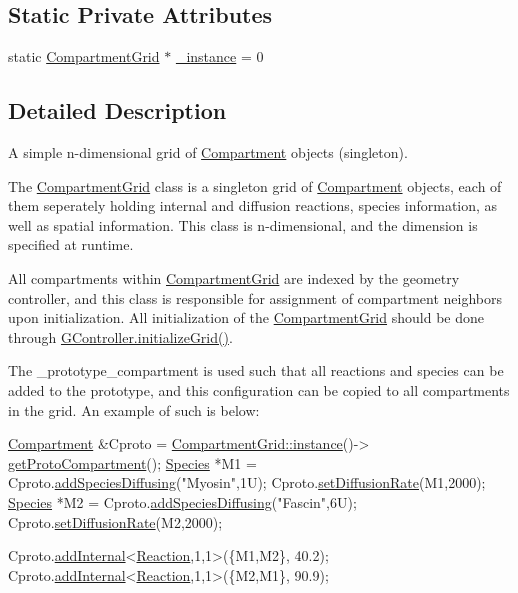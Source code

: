 \subsection*{Static Private Attributes}
\begin{DoxyCompactItemize}
\item 
static \hyperlink{classCompartmentGrid}{Compartment\+Grid} $\ast$ \hyperlink{classCompartmentGrid_ac0eb2be3df5e78d5fe6dbfb75b717866}{\+\_\+instance} = 0
\end{DoxyCompactItemize}


\subsection{Detailed Description}
A simple n-\/dimensional grid of \hyperlink{classCompartment}{Compartment} objects (singleton). 

The \hyperlink{classCompartmentGrid}{Compartment\+Grid} class is a singleton grid of \hyperlink{classCompartment}{Compartment} objects, each of them seperately holding internal and diffusion reactions, species information, as well as spatial information. This class is n-\/dimensional, and the dimension is specified at runtime.

All compartments within \hyperlink{classCompartmentGrid}{Compartment\+Grid} are indexed by the geometry controller, and this class is responsible for assignment of compartment neighbors upon initialization. All initialization of the \hyperlink{classCompartmentGrid}{Compartment\+Grid} should be done through \hyperlink{classGController_ab6320a7a310d6693855c31c0da6e975d}{G\+Controller.\+initialize\+Grid()}.

The \+\_\+prototype\+\_\+compartment is used such that all reactions and species can be added to the prototype, and this configuration can be copied to all compartments in the grid. An example of such is below\+:


\begin{DoxyCode}
\hyperlink{classCompartment}{Compartment} &Cproto = \hyperlink{classCompartmentGrid_a67c532a92e0144cac52282cf34a920f0}{CompartmentGrid::instance}()->
      \hyperlink{classCompartmentGrid_a3d698dcd594e8371254dbb38f788981d}{getProtoCompartment}();
\hyperlink{classSpecies}{Species} *M1 = Cproto.\hyperlink{classCompartment_ac03fcd8679f2ed9e3aebae8732d9ceeb}{addSpeciesDiffusing}(\textcolor{stringliteral}{"Myosin"},1U);
Cproto.\hyperlink{classCompartment_ae08ca5d423b24cd7a53fcd88670141a1}{setDiffusionRate}(M1,2000);
\hyperlink{classSpecies}{Species} *M2 = Cproto.\hyperlink{classCompartment_ac03fcd8679f2ed9e3aebae8732d9ceeb}{addSpeciesDiffusing}(\textcolor{stringliteral}{"Fascin"},6U);
Cproto.\hyperlink{classCompartment_ae08ca5d423b24cd7a53fcd88670141a1}{setDiffusionRate}(M2,2000);

Cproto.\hyperlink{classCompartment_ae6ad2810e9c10118ce24bd27acdbfa39}{addInternal}<\hyperlink{classReaction}{Reaction},1,1>(\{M1,M2\}, 40.2);
Cproto.\hyperlink{classCompartment_ae6ad2810e9c10118ce24bd27acdbfa39}{addInternal}<\hyperlink{classReaction}{Reaction},1,1>(\{M2,M1\}, 90.9);
\end{DoxyCode}
 

